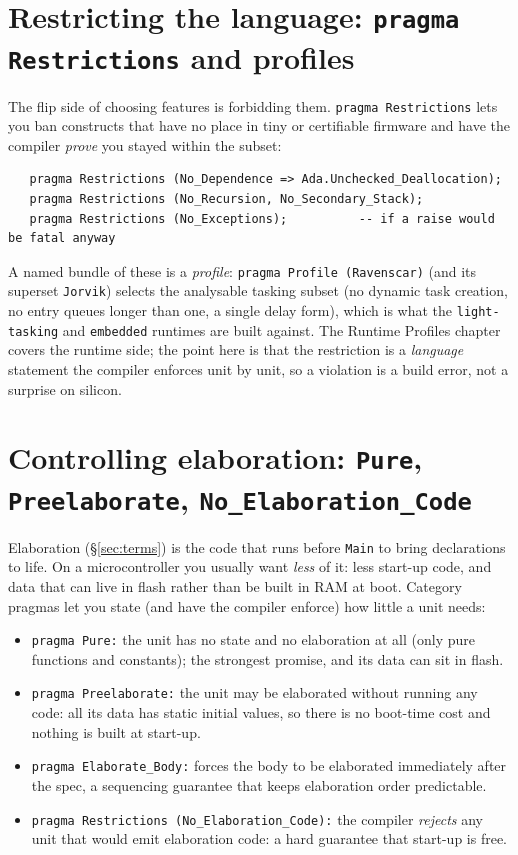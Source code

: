 \section{Restricting the language: \texttt{pragma Restrictions} and profiles}
\label{sec:restrictions}

The flip side of choosing features is forbidding them. \texttt{pragma
Restrictions} lets you ban constructs that have no place in tiny or certifiable
firmware and have the compiler \emph{prove} you stayed within the subset:

\begin{lstlisting}
   pragma Restrictions (No_Dependence => Ada.Unchecked_Deallocation);
   pragma Restrictions (No_Recursion, No_Secondary_Stack);
   pragma Restrictions (No_Exceptions);          -- if a raise would be fatal anyway
\end{lstlisting}

A named bundle of these is a \emph{profile}: \texttt{pragma Profile (Ravenscar)}
(and its superset \texttt{Jorvik}) selects the analysable tasking subset
(no dynamic task creation, no entry queues longer than one, a single delay form),
which is what the \texttt{light-tasking} and \texttt{embedded} runtimes are built
against. The Runtime Profiles chapter covers the runtime side; the point here is
that the restriction is a \emph{language} statement the compiler enforces unit by
unit, so a violation is a build error, not a surprise on silicon.

\section{Controlling elaboration: \texttt{Pure}, \texttt{Preelaborate}, \texttt{No\_Elaboration\_Code}}
\label{sec:elab}

Elaboration (\S\ref{sec:terms}) is the code that runs before \texttt{Main} to
bring declarations to life. On a microcontroller you usually want \emph{less} of
it: less start-up code, and data that can live in flash rather than be built in
RAM at boot. Category pragmas let you state (and have the compiler enforce)
how little a unit needs:

\begin{itemize}
  \item \texttt{pragma Pure:} the unit has no state and no elaboration at all
        (only pure functions and constants); the strongest promise, and its data
        can sit in flash.
  \item \texttt{pragma Preelaborate:} the unit may be elaborated without
        running any code: all its data has static initial values, so there is no
        boot-time cost and nothing is built at start-up.
  \item \texttt{pragma Elaborate\_Body:} forces the body to be elaborated
        immediately after the spec, a sequencing guarantee that keeps elaboration
        order predictable.
  \item \texttt{pragma Restrictions (No\_Elaboration\_Code):} the compiler
        \emph{rejects} any unit that would emit elaboration code: a hard guarantee
        that start-up is free.
\end{itemize}

